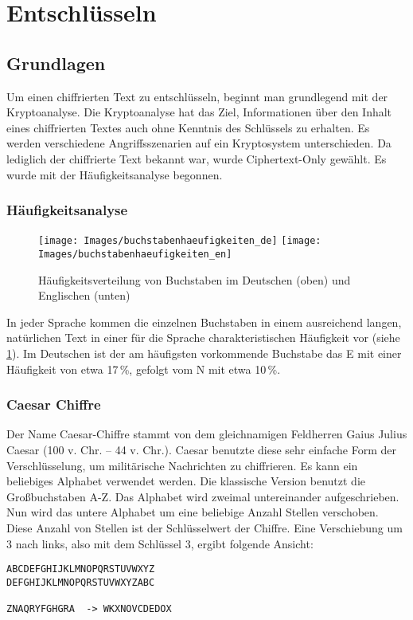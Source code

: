 \section{Entschlüsseln}
\subsection{Grundlagen}

Um einen chiffrierten Text zu entschlüsseln, beginnt man grundlegend mit der Kryptoanalyse. 
Die Kryptoanalyse hat das Ziel, Informationen über den Inhalt eines chiffrierten
Textes auch ohne Kenntnis des Schlüssels zu erhalten. Es werden verschiedene
Angriffsszenarien auf ein Kryptosystem unterschieden. Da lediglich der
chiffrierte Text bekannt war, wurde Ciphertext-Only gewählt. Es wurde mit der
Häufigkeitsanalyse begonnen.

\subsubsection{Häufigkeitsanalyse}

\begin{figure}
 \texttt{[image: Images/buchstabenhaeufigkeiten\_de]}
 \texttt{[image: Images/buchstabenhaeufigkeiten\_en]}
 \caption{Häufigkeitsverteilung von Buchstaben im Deutschen (oben) und Englischen (unten) \cite[kap2.pdf, s. 30]{Koebler}}
 \label{fig:buchstabenhaeufigkeiten}
\end{figure}

In jeder Sprache kommen die einzelnen Buchstaben in einem ausreichend langen,
natürlichen Text in einer für die Sprache charakteristischen Häufigkeit vor
(siehe \cref{fig:buchstabenhaeufigkeiten}). Im Deutschen ist der am
häufigsten vorkommende Buchstabe das E mit einer Häufigkeit von etwa 17\,\%,
gefolgt vom N mit etwa 10\,\%.

\subsubsection{Caesar Chiffre}

Der Name Caesar-Chiffre stammt von dem gleichnamigen Feldherren Gaius Julius
Caesar (100 v. Chr. – 44 v. Chr.). Caesar benutzte diese sehr einfache Form der
Verschlüsselung, um militärische Nachrichten zu chiffrieren.  Es kann ein
beliebiges Alphabet verwendet werden. Die klassische Version benutzt die
Großbuchstaben A-Z. Das Alphabet wird zweimal untereinander aufgeschrieben.
Nun wird das untere Alphabet um eine beliebige Anzahl Stellen verschoben. Diese
Anzahl von Stellen ist der Schlüsselwert der Chiffre. Eine Verschiebung um 3
nach links, also mit dem Schlüssel 3, ergibt folgende Ansicht:

\begin{lstlisting}
ABCDEFGHIJKLMNOPQRSTUVWXYZ
DEFGHIJKLMNOPQRSTUVWXYZABC

ZNAQRYFGHGRA  -> WKXNOVCDEDOX
\end{lstlisting}
